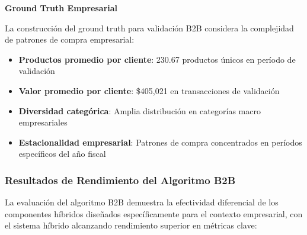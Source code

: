 \documentclass[twocolumn]{article}
\begin{document}
\textbf{Ground Truth Empresarial}

La construcción del ground truth para validación B2B considera la complejidad de patrones de compra empresarial:
\begin{itemize}
    \item \textbf{Productos promedio por cliente}: 230.67 productos únicos en período de validación
    \item \textbf{Valor promedio por cliente}: \$405,021 en transacciones de validación 
    \item \textbf{Diversidad categórica}: Amplia distribución en categorías macro empresariales
    \item \textbf{Estacionalidad empresarial}: Patrones de compra concentrados en períodos específicos del año fiscal
\end{itemize}

\subsubsection{Resultados de Rendimiento del Algoritmo B2B}

La evaluación del algoritmo B2B demuestra la efectividad diferencial de los componentes híbridos diseñados específicamente para el contexto empresarial, con el sistema híbrido alcanzando rendimiento superior en métricas clave:
\end{document}
